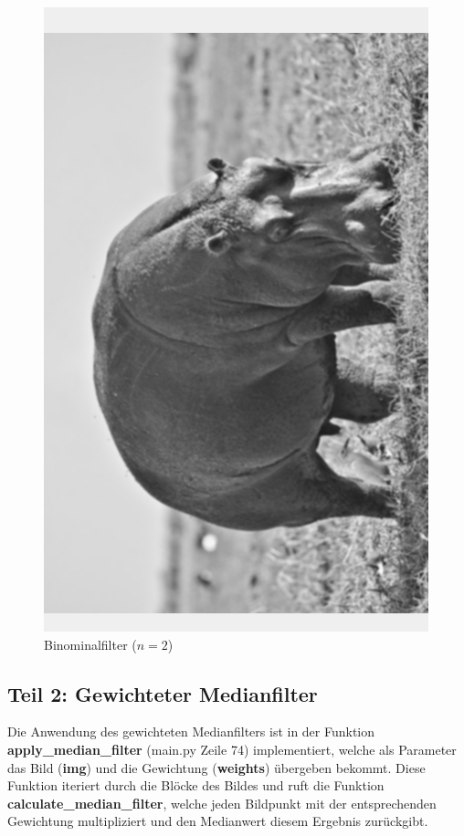 \documentclass[12pt]{article}
\begin{document}
\begin{figure}[H]
\begin{minipage}{0.49\textwidth}
    \includegraphics[width=\textwidth, height=0.4\textheight, keepaspectratio]{binominal_2.png}
    Binominalfilter ($n = 2$)
  \end{minipage}
\end{figure}
\newpage

\subsection*{Teil 2: Gewichteter Medianfilter}
Die Anwendung des gewichteten Medianfilters ist in der Funktion \textbf{apply\_median\_filter} (main.py Zeile 74) implementiert, welche als Parameter das Bild (\textbf{img}) und die Gewichtung (\textbf{weights}) übergeben bekommt.
Diese Funktion iteriert durch die Blöcke des Bildes und ruft die Funktion \textbf{calculate\_median\_filter}, welche jeden Bildpunkt mit der entsprechenden Gewichtung multipliziert und den Medianwert diesem Ergebnis zurückgibt.
\end{document}
